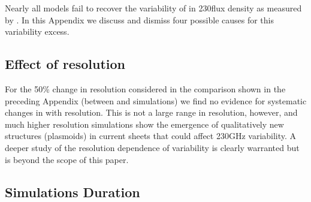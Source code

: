 
Nearly all models fail to recover the variability of \sgra in 230\GHz flux density as measured by .
In this Appendix we discuss and dismiss four possible causes for this variability excess.

\subsection{Effect of resolution}

For the 50\% change in resolution considered in the comparison shown in the preceding Appendix (between \kharma and \bhac simulations) we find no
evidence for systematic changes in  with resolution.  This is not a large
range in resolution, however, and much higher resolution simulations \citep{2022ApJ...924L..32R, 2020ApJ...900..100R, 2021arXiv211103689N}
show the emergence of qualitatively
new structures (plasmoids) in current sheets that could affect 230GHz variability.
A deeper study of the resolution dependence of variability is clearly warranted
but is beyond the scope of this paper.


\subsection{Simulations Duration}\label{app:narayan}

